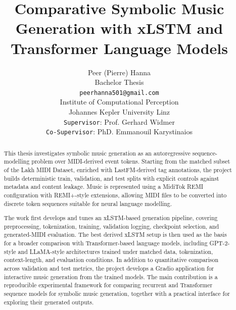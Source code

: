 \documentclass{article}
\title{Comparative Symbolic Music Generation with xLSTM and Transformer Language Models}
\author{%
  Peer (Pierre) Hanna \\
  Bachelor Thesis\\
  \texttt{peerhanna501@gmail.com} \\ 
  Institute of Computational Perception \\
  Johannes Kepler University Linz \\
  \texttt{Supervisor}: Prof. Gerhard Widmer\\ 
  \texttt{Co-Supervisor}: PhD. Emmanouil Karystinaios
}
\begin{document}
\maketitle

\begin{abstract}
	This thesis investigates symbolic music generation as an autoregressive
	sequence-modelling problem over MIDI-derived event tokens. Starting from the
	matched subset of the Lakh MIDI Dataset, enriched with LastFM-derived tag
	annotations, the project builds deterministic train, validation, and test
	splits with explicit controls against metadata and content leakage. Music is
	represented using a MidiTok REMI configuration with REMI+-style extensions,
	allowing MIDI files to be converted into discrete token sequences suitable
	for neural language modelling.

	The work first develops and tunes an xLSTM-based generation pipeline, covering
	preprocessing, tokenization, training, validation logging, checkpoint
	selection, and generated-MIDI evaluation. The best derived xLSTM setup is then
	used as the basis for a broader comparison with Transformer-based language
	models, including GPT-2-style and LLaMA-style architectures trained under
	matched data, tokenization, context-length, and evaluation conditions. In
	addition to quantitative comparison across validation and test metrics, the
	project develops a Gradio application for interactive music generation from
	the trained models. The main contribution is a reproducible experimental
	framework for comparing recurrent and Transformer sequence models for
	symbolic music generation, together with a practical interface for exploring
	their generated outputs.
\end{abstract}



























%







\end{document}
